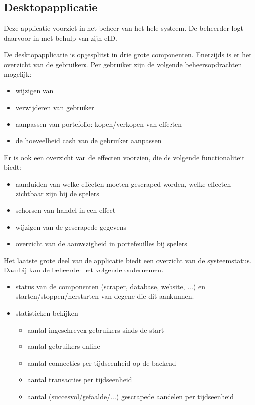 \subsection{Desktopapplicatie}

Deze applicatie voorziet in het beheer van het hele systeem. De beheerder logt daarvoor in met behulp van zijn eID.

De desktopapplicatie is opgesplitst in drie grote componenten.
Enerzijds is er het overzicht van de gebruikers. Per gebruiker zijn de volgende beheersopdrachten mogelijk: 
\begin{itemize}
\item{wijzigen van}
\item{verwijderen van gebruiker}
\item{aanpassen van portefolio: kopen/verkopen van effecten}
\item{de hoeveelheid cash van de gebruiker aanpassen}
\end{itemize}

Er is ook een overzicht van de effecten voorzien, die de volgende functionaliteit biedt:
\begin{itemize}
\item{aanduiden van welke effecten moeten gescraped worden, welke effecten zichtbaar zijn bij de spelers}
\item{schorsen van handel in een effect}
\item{wijzigen van de gescrapede gegevens}
\item{overzicht van de aanwezigheid in portefeuilles bij spelers}
\end{itemize}

Het laatste grote deel van de applicatie biedt een overzicht van de systeemstatus. Daarbij kan de beheerder het volgende ondernemen:
\begin{itemize}
\item{status van de componenten (scraper, database, website, ...) en starten/stoppen/herstarten van degene die dit aankunnen.}
\item{statistieken bekijken}
	\begin{itemize}
	\item{aantal ingeschreven gebruikers sinds de start}
	\item{aantal gebruikers online}
	\item{aantal connecties per tijdseenheid op de backend}
	\item{aantal transacties per tijdseenheid}
	\item{aantal (succesvol/gefaalde/...) gescrapede aandelen per tijdseenheid}
	\end{itemize}
\end{itemize}

